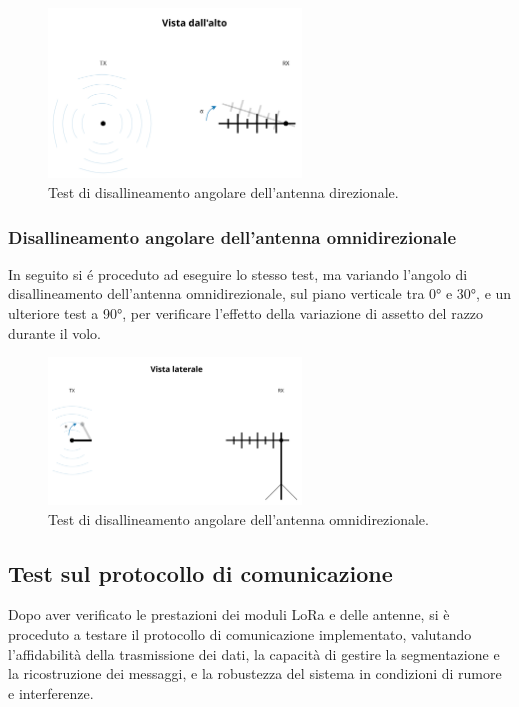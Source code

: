 \documentclass[12pt,a4paper,twoside]{book}
\begin{document}
\begin{figure}[H]
    \centering
    \includegraphics[width=0.6\textwidth]{img/telemetry-test-direct.png}
    \caption{Test di disallineamento angolare dell'antenna direzionale.}
    \label{fig:directional-test}
\end{figure}

\subsubsection{Disallineamento angolare dell'antenna omnidirezionale}
In seguito si \'e proceduto ad eseguire lo stesso test, ma variando l'angolo di
disallineamento dell'antenna omnidirezionale, sul piano verticale tra 0° e 30°,
e un ulteriore test a 90°, per verificare l'effetto della variazione di assetto
del razzo durante il volo.

\begin{figure}[H]
    \centering
    \includegraphics[width=0.6\textwidth]{img/telemetry-test-omni.png}
    \caption{Test di disallineamento angolare dell'antenna omnidirezionale.}
    \label{fig:omnidirectional-test}
\end{figure}

\subsection{Test sul protocollo di comunicazione}
Dopo aver verificato le prestazioni dei moduli \ac{LoRa} e delle antenne, si è
proceduto a testare il protocollo di comunicazione implementato, valutando
l'affidabilità della trasmissione dei dati, la capacità di gestire la segmentazione
e la ricostruzione dei messaggi, e la robustezza del sistema in condizioni
di rumore e interferenze.
\end{document}
